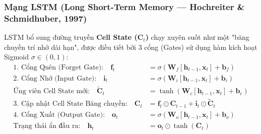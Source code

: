 \documentclass[10pt,a4paper]{article}
\begin{document}
\subsubsection{Mạng LSTM (Long Short-Term Memory --- Hochreiter \& Schmidhuber, 1997)}
LSTM bổ sung đường truyền \textbf{Cell State ($\mathbf{C}_t$)} chạy xuyên suốt như một "băng chuyền trí nhớ dài hạn", được điều tiết bởi 3 cổng (Gates) sử dụng hàm kích hoạt Sigmoid $\sigma \in (0, 1)$:
\begin{align}
    \text{1. Cổng Quên (Forget Gate):} \quad \mathbf{f}_t &= \sigma(\mathbf{W}_f [\mathbf{h}_{t-1}, \mathbf{x}_t] + \mathbf{b}_f) \\
    \text{2. Cổng Nhớ (Input Gate):} \quad \mathbf{i}_t &= \sigma(\mathbf{W}_i [\mathbf{h}_{t-1}, \mathbf{x}_t] + \mathbf{b}_i) \\
    \text{Ứng viên Cell State mới:} \quad \tilde{\mathbf{C}}_t &= \tanh(\mathbf{W}_c [\mathbf{h}_{t-1}, \mathbf{x}_t] + \mathbf{b}_c) \\
    \text{3. Cập nhật Cell State Băng chuyền:} \quad \mathbf{C}_t &= \mathbf{f}_t \odot \mathbf{C}_{t-1} + \mathbf{i}_t \odot \tilde{\mathbf{C}}_t \\
    \text{4. Cổng Xuất (Output Gate):} \quad \mathbf{o}_t &= \sigma(\mathbf{W}_o [\mathbf{h}_{t-1}, \mathbf{x}_t] + \mathbf{b}_o) \\
    \text{Trạng thái ẩn đầu ra:} \quad \mathbf{h}_t &= \mathbf{o}_t \odot \tanh(\mathbf{C}_t)
\end{align}
\end{document}
